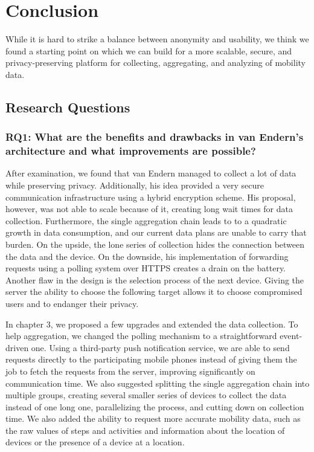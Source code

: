 
\chapter{Conclusion}\label{chapter:conclusion}
While it is hard to strike a balance between anonymity and usability, we think we found a starting point on which we can build for a more scalable, secure, and privacy-preserving platform for collecting, aggregating, and analyzing of mobility data.

\section{Research Questions}
\subsection*{RQ1: What are the benefits and drawbacks in van Endern's architecture and what improvements are possible?}
After examination, we found that van Endern managed to collect a lot of data while preserving privacy. Additionally, his idea provided a very secure communication infrastructure using a hybrid encryption scheme. His proposal, however, was not able to scale because of it, creating long wait times for data collection.
Furthermore, the single aggregation chain leads to to a quadratic growth in data consumption, and our current data plans are unable to carry that burden. On the upside, the lone series of collection hides the connection between the data and the device. On the downside, his implementation of forwarding requests using a polling system over HTTPS creates a drain on the battery.
Another flaw in the design is the selection process of the next device. Giving the server the ability to choose the following target allows it to choose compromised users and to endanger their privacy. 

In chapter 3, we proposed a few upgrades and extended the data collection. To help aggregation, we changed the polling mechanism to a straightforward event-driven one. Using a third-party push notification service, we are able to send requests directly to the participating mobile phones instead of giving them the job to fetch the requests from the server, improving significantly on communication time. We also suggested splitting the single aggregation chain into multiple groups, creating several smaller series of devices to collect the data instead of one long one, parallelizing the process, and cutting down on collection time. We also added the ability to request more accurate mobility data, such as the raw values of steps and activities and information about the location of devices or the presence of a device at a location. 

